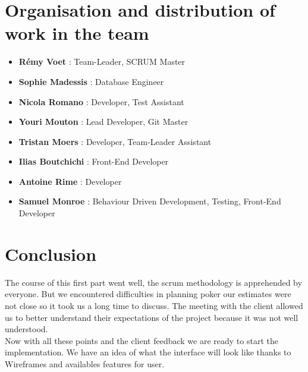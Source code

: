 \documentclass{article}
\begin{document}
\section{Organisation and distribution of work in the team}

    \begin{itemize}

        \item \textbf{Rémy Voet} : Team-Leader, SCRUM Master
        \item \textbf{Sophie Madessis} : Database Engineer
        \item \textbf{Nicola Romano} : Developer, Test Assistant
        \item \textbf{Youri Mouton} : Lead Developer, Git Master
        \item \textbf{Tristan Moers} : Developer, Team-Leader Assistant
        \item \textbf{Ilias Boutchichi} : Front-End Developer
        \item \textbf{Antoine Rime} : Developer
        \item \textbf{Samuel Monroe} : Behaviour Driven Development, Testing, Front-End Developer
    \end{itemize}

\section{Conclusion}
The course of this first part went well, the scrum methodology is apprehended by everyone. But we encountered difficulties in planning poker our estimates were not close so it took us a long time to discuss. The meeting with the client allowed us to better understand their expectations of the project because it was not well understood. \\

Now with all these points and the client feedback we are ready to start the implementation. We have an idea of what the interface will look like thanks to Wireframes and availables features for user.
\end{document}
